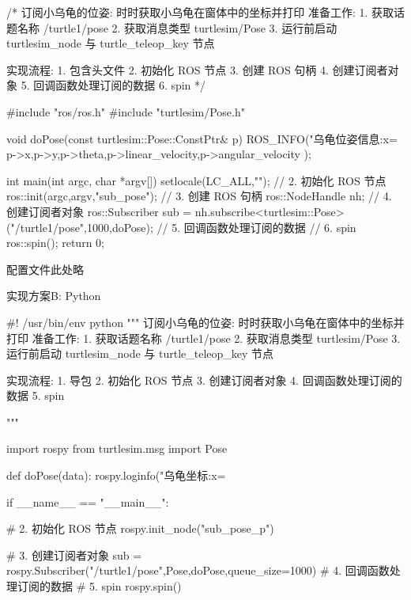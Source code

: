 \documentclass[openany, fontset=windowsold]{ctexbook}
\theoremstyle{kaiti}
\theoremstyle{normal}
\begin{document}
\begin{cpp}
  /*  
      订阅小乌龟的位姿: 时时获取小乌龟在窗体中的坐标并打印
      准备工作:
          1. 获取话题名称 /turtle1/pose
          2. 获取消息类型 turtlesim/Pose
          3. 运行前启动 turtlesim_node 与 turtle_teleop_key 节点

      实现流程:
          1. 包含头文件
          2. 初始化 ROS 节点
          3. 创建 ROS 句柄
          4. 创建订阅者对象
          5. 回调函数处理订阅的数据
          6. spin
  */

  #include "ros/ros.h"
  #include "turtlesim/Pose.h"

  void doPose(const turtlesim::Pose::ConstPtr& p){
      ROS_INFO("乌龟位姿信息:x=%
          p->x,p->y,p->theta,p->linear_velocity,p->angular_velocity
      );
  }

  int main(int argc, char *argv[])
  {
      setlocale(LC_ALL,"");
      // 2. 初始化 ROS 节点
      ros::init(argc,argv,"sub_pose");
      // 3. 创建 ROS 句柄
      ros::NodeHandle nh;
      // 4. 创建订阅者对象
      ros::Subscriber sub = nh.subscribe<turtlesim::Pose>("/turtle1/pose",1000,doPose);
      // 5. 回调函数处理订阅的数据
      // 6. spin
      ros::spin();
      return 0;
  }
\end{cpp}

配置文件此处略

实现方案B: Python

\begin{python}
  #! /usr/bin/env python
  """
      订阅小乌龟的位姿: 时时获取小乌龟在窗体中的坐标并打印
      准备工作:
          1. 获取话题名称 /turtle1/pose
          2. 获取消息类型 turtlesim/Pose
          3. 运行前启动 turtlesim_node 与 turtle_teleop_key 节点

      实现流程:
          1. 导包
          2. 初始化 ROS 节点
          3. 创建订阅者对象
          4. 回调函数处理订阅的数据
          5. spin

  """

  import rospy
  from turtlesim.msg import Pose

  def doPose(data):
      rospy.loginfo("乌龟坐标:x=%

  if __name__ == "__main__":

      # 2. 初始化 ROS 节点
      rospy.init_node("sub_pose_p")

      # 3. 创建订阅者对象
      sub = rospy.Subscriber("/turtle1/pose",Pose,doPose,queue_size=1000)
      #     4. 回调函数处理订阅的数据
      #     5. spin
      rospy.spin()
\end{python}
\end{document}
